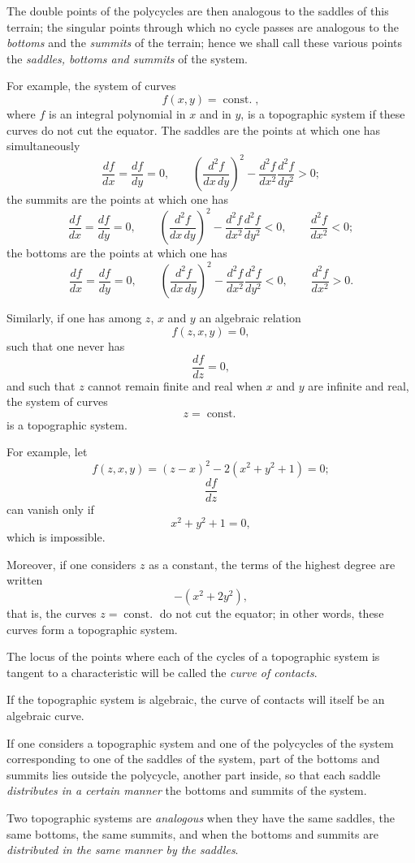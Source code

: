 \documentclass[11pt]{article}
\begin{document}
The double points of the polycycles are then analogous to the saddles of this terrain; the singular points through which no cycle passes are analogous to the \emph{bottoms} and the \emph{summits} of the terrain; hence we shall call these various points the \emph{saddles, bottoms and summits} of the system.

For example, the system of curves
\[
f(x,y)=\operatorname{const.},
\]
where $f$ is an integral polynomial in $x$ and in $y$, is a topographic system if these curves do not cut the equator. The saddles are the points at which one has simultaneously
\[
\frac{df}{dx}=\frac{df}{dy}=0,
\qquad
\left(\frac{d^2f}{dx\,dy}\right)^2-\frac{d^2f}{dx^2}\frac{d^2f}{dy^2}>0;
\]
the summits are the points at which one has
\[
\frac{df}{dx}=\frac{df}{dy}=0,
\qquad
\left(\frac{d^2f}{dx\,dy}\right)^2-\frac{d^2f}{dx^2}\frac{d^2f}{dy^2}<0,
\qquad
\frac{d^2f}{dx^2}<0;
\]
the bottoms are the points at which one has
\[
\frac{df}{dx}=\frac{df}{dy}=0,
\qquad
\left(\frac{d^2f}{dx\,dy}\right)^2-\frac{d^2f}{dx^2}\frac{d^2f}{dy^2}<0,
\qquad
\frac{d^2f}{dx^2}>0.
\]

Similarly, if one has among $z$, $x$ and $y$ an algebraic relation
\[
f(z,x,y)=0,
\]
such that one never has
\[
\frac{df}{dz}=0,
\]
and such that $z$ cannot remain finite and real when $x$ and $y$ are infinite and real, the system of curves
\[
z=\operatorname{const.}
\]
is a topographic system.

For example, let
\[
f(z,x,y)=(z-x)^2-2(x^2+y^2+1)=0;
\]
\[
\frac{df}{dz}
\]
can vanish only if
\[
x^2+y^2+1=0,
\]
which is impossible.

Moreover, if one considers $z$ as a constant, the terms of the highest degree are written
\[
-(x^2+2y^2),
\]
that is, the curves $z=\operatorname{const.}$ do not cut the equator; in other words, these curves form a topographic system.

The locus of the points where each of the cycles of a topographic system is tangent to a characteristic will be called the \emph{curve of contacts}.

If the topographic system is algebraic, the curve of contacts will itself be an algebraic curve.

If one considers a topographic system and one of the polycycles of the system corresponding to one of the saddles of the system, part of the bottoms and summits lies outside the polycycle, another part inside, so that each saddle \emph{distributes in a certain manner} the bottoms and summits of the system.

Two topographic systems are \emph{analogous} when they have the same saddles, the same bottoms, the same summits, and when the bottoms and summits are \emph{distributed in the same manner by the saddles}.
\end{document}
